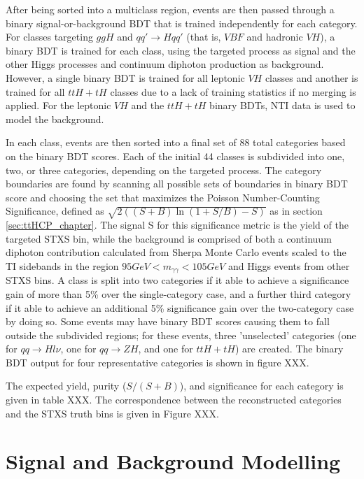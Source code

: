 After being sorted into a multiclass region, events are then passed through a binary signal-or-background BDT that is trained independently for each category. For classes targeting $ggH$ and $qq' \rightarrow Hqq'$ (that is, $VBF$ and hadronic $VH$), a binary BDT is trained for each class, using the targeted process as signal and the other Higgs processes and continuum diphoton production as background. However, a single binary BDT is trained for all leptonic $VH$ classes and another is trained for all $ttH+tH$ classes due to a lack of training statistics if no merging is applied. For the leptonic $VH$ and the $ttH+tH$ binary BDTs, NTI data is used to model the background.

In each class, events are then sorted into a final set of 88 total categories based on the binary BDT scores. Each of the initial 44 classes is subdivided into one, two, or three categories, depending on the targeted process. The category boundaries are found by scanning all possible sets of boundaries in binary BDT score and choosing the set that maximizes the Poisson Number-Counting Significance, defined as $\sqrt{2((S+B)\ln(1+S/B)-S)}$ as in section \ref{sec:ttHCP_chapter}. The signal S for this significance metric is the yield of the targeted STXS bin, while the background is comprised of both a continuum diphoton contribution calculated from Sherpa Monte Carlo events scaled to the TI sidebands in the region $95 GeV < m_{\gamma \gamma} < 105 GeV$ and Higgs events from other STXS bins. A class is split into two categories if it able to achieve a significance gain of more than 5\% over the single-category case, and a further third category if it able to achieve an additional 5\% significance gain over the two-category case by doing so. Some events may have binary BDT scores causing them to fall outside the subdivided regions; for these events, three 'unselected' categories (one for $qq \rightarrow H l \nu$, one for $qq \rightarrow ZH$, and one for $ttH+tH$) are created. The binary BDT output for four representative categories is shown in figure XXX.


The expected yield, purity ($S/(S+B)$), and significance for each category is given in table XXX. The correspondence between the reconstructed categories and the STXS truth bins is given in Figure XXX.

\section{Signal and Background Modelling} \label{sec:SignalBackground} 

